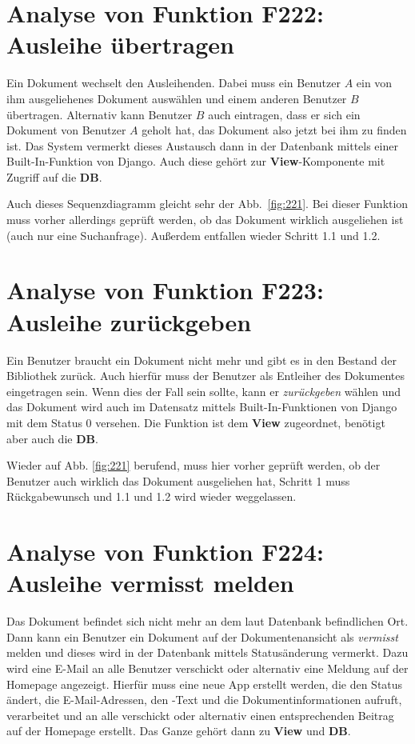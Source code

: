\section{Analyse von Funktion F222: Ausleihe übertragen}
\label{f:222}
Ein Dokument wechselt den Ausleihenden. Dabei muss ein Benutzer $A$ ein von ihm ausgeliehenes Dokument auswählen und einem anderen Benutzer $B$ übertragen. Alternativ kann Benutzer $B$ auch eintragen, dass er sich ein Dokument von Benutzer $A$ geholt hat, das Dokument also jetzt bei ihm zu finden ist. Das System vermerkt dieses Austausch dann in der Datenbank mittels einer Built-In-Funktion von Django. Auch diese gehört zur \textbf{View}-Komponente mit Zugriff auf die \textbf{DB}.

Auch dieses Sequenzdiagramm gleicht sehr der Abb.\ \ref{fig:221}. Bei dieser Funktion muss vorher allerdings geprüft werden, ob das Dokument wirklich ausgeliehen ist (auch nur eine Suchanfrage). Außerdem entfallen wieder Schritt 1.1 und 1.2.

\section{Analyse von Funktion F223: Ausleihe zurückgeben}
\label{f:223}
Ein Benutzer braucht ein Dokument nicht mehr und gibt es in den Bestand der Bibliothek zurück. Auch hierfür muss der Benutzer als Entleiher des Dokumentes eingetragen sein. Wenn dies der Fall sein sollte, kann er \emph{zurückgeben} wählen und das Dokument wird auch im Datensatz mittels Built-In-Funktionen von Django mit dem Status 0 versehen. Die Funktion ist dem \textbf{View} zugeordnet, benötigt aber auch die \textbf{DB}.

Wieder auf Abb. \ref{fig:221} berufend, muss hier vorher geprüft werden, ob der Benutzer auch wirklich das Dokument ausgeliehen hat, Schritt 1 muss \glqq Rückgabewunsch \grqq und 1.1 und 1.2 wird wieder weggelassen.

\section{Analyse von Funktion F224: Ausleihe vermisst melden}
\label{f:224}
Das Dokument befindet sich nicht mehr an dem laut Datenbank befindlichen Ort. Dann kann ein Benutzer ein Dokument auf der Dokumentenansicht als \emph{vermisst} melden und dieses wird in der Datenbank mittels Statusänderung vermerkt. Dazu wird eine E-Mail an alle Benutzer verschickt oder alternativ eine Meldung auf der Homepage angezeigt. Hierfür muss eine neue App erstellt werden, die den Status ändert, die E-Mail-Adressen, den -Text und die Dokumentinformationen aufruft, verarbeitet und an alle verschickt oder alternativ einen entsprechenden Beitrag auf der Homepage erstellt. Das Ganze gehört dann zu \textbf{View} und \textbf{DB}.

